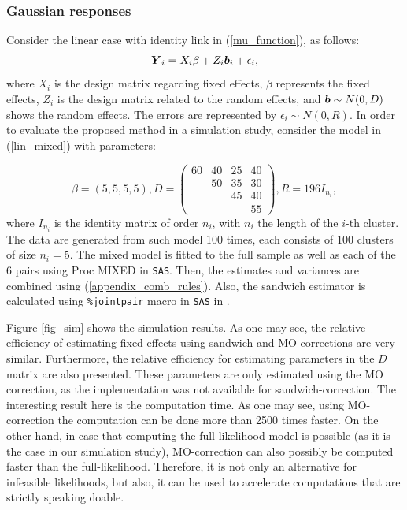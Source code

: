 \documentclass[11pt,a5paper,twoside]{book}
\newcommand{\BY}{\mbox{\boldmath $Y$}}
\newcommand{\Bb}{\mbox{\boldmath $b$}}
\begin{document}
\subsubsection{Gaussian responses}
\label{subsec_lin}
Consider the linear case with identity link in (\ref{mu_function}), as follows:
\begin{equation}
\label{lin_mixed}
\BY_i= X_i \beta + Z_i \Bb_i + \epsilon_i,
\end{equation}
where $X_i$ is the design matrix regarding fixed effects, $\beta$ represents the fixed effects, $Z_i$ is the design matrix related to the random effects, and $\Bb\sim N(0,D)$ shows the random effects. The errors are represented by $\epsilon_i\sim N(0,R)$. In order to evaluate the proposed method in a simulation study, consider the model in (\ref{lin_mixed}) with parameters:

\begin{equation}
\label{sim_params}
\beta=(5,5,5,5), D= \left(
\begin{array}{cccc}
60 & 40 & 25 & 40 \\
& 50 & 35& 30 \\
& & 45 & 40 \\
&&&55
\end{array} \right), R= 196 I_{n_i},
\end{equation}
where $I_{n_i}$ is the identity matrix of order $n_i$, with $n_i$ the length of the $i$-th cluster. {\color{black}{This means that both of the $X_i$ and $Z_i$ are formed by columns of $1$'s.}} The data are generated from such model 100 times, each consists of 100 clusters of size $n_i=5$. The mixed model is fitted to the full sample as well as each of the 6 pairs using Proc MIXED in {\tt{SAS}}. Then, the estimates and variances are combined using (\ref{appendix_comb_rules}). Also, the sandwich estimator is calculated using {\tt{\%jointpair}} macro in {\tt{SAS}} in \cite{pair_lin}.

Figure \ref{fig_sim} shows the simulation results. As one may see, the relative efficiency of estimating fixed effects using sandwich and MO corrections are very similar. Furthermore, the relative efficiency for estimating parameters in the $D$ matrix are also presented. These parameters are only estimated using the MO correction, as the implementation was not available for sandwich-correction. The interesting result here is the computation time. As one may see, using MO-correction the computation can be done more than 2500 times faster. On the other hand, in case that computing the full likelihood model is possible (as it is the case in our simulation study), MO-correction can also possibly be computed faster than the full-likelihood. Therefore, it is not only an alternative for infeasible likelihoods, but also, it can be used to accelerate computations that are strictly speaking doable.
\end{document}
